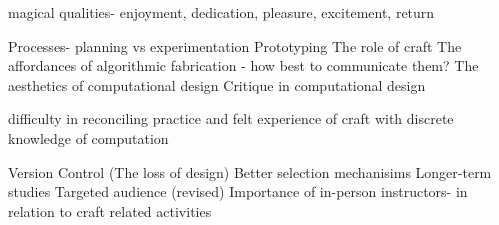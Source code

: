 	magical qualities- enjoyment, dedication, pleasure, excitement, return

	Processes- planning vs experimentation
	Prototyping
	The role of craft
	The affordances of algorithmic fabrication - how best to communicate them?
	The aesthetics of computational design
	Critique in computational design
	
	difficulty in reconciling practice and felt experience of craft with discrete knowledge of computation
	
	

	
	Version Control (The loss of design)
	Better selection mechanisims
	Longer-term studies
Targeted audience (revised)
Importance of in-person instructors- in relation to craft related activities
